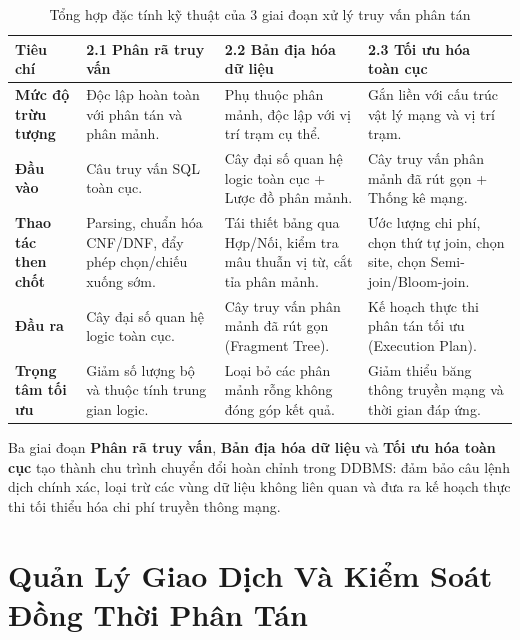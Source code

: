 \documentclass[12pt,a4paper]{report}
\begin{document}
\begin{table}[!ht]
\centering
\small
\caption{Tổng hợp đặc tính kỹ thuật của 3 giai đoạn xử lý truy vấn phân tán}
\label{tab:query_phases_comparison}
\renewcommand{\arraystretch}{1.25}
\begin{tabularx}{\textwidth}{|>{\raggedright\arraybackslash\bfseries}p{2.6cm}|>{\raggedright\arraybackslash}X|>{\raggedright\arraybackslash}X|>{\raggedright\arraybackslash}X|}
\hline
\textbf{Tiêu chí} & \textbf{2.1 Phân rã truy vấn} & \textbf{2.2 Bản địa hóa dữ liệu} & \textbf{2.3 Tối ưu hóa toàn cục} \\ \hline
Mức độ trừu tượng & Độc lập hoàn toàn với phân tán và phân mảnh. & Phụ thuộc phân mảnh, độc lập với vị trí trạm cụ thể. & Gắn liền với cấu trúc vật lý mạng và vị trí trạm. \\ \hline
Đầu vào & Câu truy vấn SQL toàn cục. & Cây đại số quan hệ logic toàn cục + Lược đồ phân mảnh. & Cây truy vấn phân mảnh đã rút gọn + Thống kê mạng. \\ \hline
Thao tác then chốt & Parsing, chuẩn hóa CNF/DNF, đẩy phép chọn/chiếu xuống sớm. & Tái thiết bảng qua Hợp/Nối, kiểm tra mâu thuẫn vị từ, cắt tỉa phân mảnh. & Ước lượng chi phí, chọn thứ tự join, chọn site, chọn Semi-join/Bloom-join. \\ \hline
Đầu ra & Cây đại số quan hệ logic toàn cục. & Cây truy vấn phân mảnh đã rút gọn (Fragment Tree). & Kế hoạch thực thi phân tán tối ưu (Execution Plan). \\ \hline
Trọng tâm tối ưu & Giảm số lượng bộ và thuộc tính trung gian logic. & Loại bỏ các phân mảnh rỗng không đóng góp kết quả. & Giảm thiểu băng thông truyền mạng và thời gian đáp ứng. \\ \hline
\end{tabularx}
\end{table}

Ba giai đoạn \textbf{Phân rã truy vấn}, \textbf{Bản địa hóa dữ liệu} và \textbf{Tối ưu hóa toàn cục} tạo thành chu trình chuyển đổi hoàn chỉnh trong DDBMS: đảm bảo câu lệnh dịch chính xác, loại trừ các vùng dữ liệu không liên quan và đưa ra kế hoạch thực thi tối thiểu hóa chi phí truyền thông mạng.

\chapter{Quản Lý Giao Dịch Và Kiểm Soát Đồng Thời Phân Tán}
\end{document}
